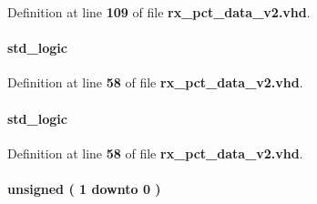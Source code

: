 Definition at line {\bf 109} of file {\bf rx\+\_\+pct\+\_\+data\+\_\+v2.\+vhd}.

\paragraph[{en\+\_\+reg0}]{ {\bfseries \textcolor{comment}{std\+\_\+logic}\textcolor{vhdlchar}{ }} \hspace{0.3cm}{\ttfamily [Signal]}}\label{classrx__pct__data__v2_1_1arch_a7c33480743f334556c3030db83365d4b}


Definition at line {\bf 58} of file {\bf rx\+\_\+pct\+\_\+data\+\_\+v2.\+vhd}.

\paragraph[{en\+\_\+reg1}]{ {\bfseries \textcolor{comment}{std\+\_\+logic}\textcolor{vhdlchar}{ }} \hspace{0.3cm}{\ttfamily [Signal]}}\label{classrx__pct__data__v2_1_1arch_a9a9ede2ae338deccaf3678c1b93e05cd}


Definition at line {\bf 58} of file {\bf rx\+\_\+pct\+\_\+data\+\_\+v2.\+vhd}.

\paragraph[{head\+\_\+cnt}]{ {\bfseries \textcolor{comment}{unsigned}\textcolor{vhdlchar}{ }\textcolor{vhdlchar}{(}\textcolor{vhdlchar}{ }\textcolor{vhdlchar}{ } \textcolor{vhdldigit}{1} \textcolor{vhdlchar}{ }\textcolor{keywordflow}{downto}\textcolor{vhdlchar}{ }\textcolor{vhdlchar}{ } \textcolor{vhdldigit}{0} \textcolor{vhdlchar}{ }\textcolor{vhdlchar}{)}\textcolor{vhdlchar}{ }} \hspace{0.3cm}{\ttfamily [Signal]}}\label{classrx__pct__data__v2_1_1arch_afd213283a5f9bfb68b46ccb92e42f827}


